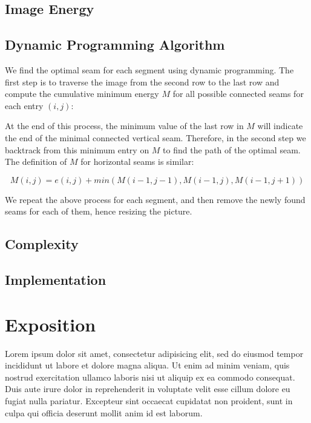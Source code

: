 \documentclass[conference]{acmsiggraph}
\begin{document}
\subsection{Image Energy}


\subsection{Dynamic Programming Algorithm}
We find the optimal seam for each segment using dynamic programming. The first step is to traverse the image from the second row to the last row and compute the cumulative minimum energy $M$ for all possible connected seams for each entry $(i, j)$:

At the end of this process, the minimum value of the last row in $M$ will indicate the end of the minimal connected vertical seam. Therefore, in the second step we backtrack from this minimum entry on $M$ to find the path of the optimal seam. The definition of $M$ for horizontal seams is similar:

\begin{equation}
M(i,j) = e(i,j) + min( M(i-1,j-1), M(i-1,j), M(i-1,j+1) )
\end{equation}

We repeat the above process for each segment, and then remove the newly found seams for each of them, hence resizing the picture.

\subsection{Complexity}


\subsection{Implementation}





\section{Exposition}

Lorem ipsum dolor sit amet, consectetur adipisicing elit, sed do
eiusmod tempor incididunt ut labore et dolore magna aliqua. Ut enim ad
minim veniam, quis nostrud exercitation ullamco laboris nisi ut
aliquip ex ea commodo consequat. Duis aute irure dolor in
reprehenderit in voluptate velit esse cillum dolore eu fugiat nulla
pariatur. Excepteur sint occaecat cupidatat non proident, sunt in
culpa qui officia deserunt mollit anim id est laborum.
\end{document}

